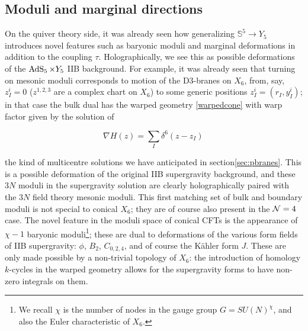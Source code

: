 %
%
%
%

\subsection{Moduli and marginal directions}

On the quiver theory side, it was already seen how generalizing $\mathbb{S}^5 \rightarrow Y_5$ introduces novel features such as baryonic moduli and marginal deformations in addition to the coupling $\tau$. Holographically, we see this as possible deformations of the $\operatorname{AdS}_{5} \times Y_5$ IIB background. For example, it was already seen that turning on mesonic moduli corresponds to motion of the D3-branes on $X_6$, from, say, $z_I^i = 0$ ($z^{1,2,3}$ are a complex chart on $X_6$) to some generic positions $z_I^i = (r_I, y_I^i)$; in that case the bulk dual has the warped geometry \eqref{warpedcone} with warp factor given by the solution of \cite{MZ}

\begin{equation}
	\nabla H (z) = \sum_I \delta^6(z - z_I)\,
	\label{}
\end{equation}

the kind of multicentre solutions we have anticipated in section\ref{sec:pbranes}. This is a possible deformation of the original IIB supergravity background, and these $3N$ moduli in the supergravity solution are clearly holographically paired with the $3N$ field theory mesonic moduli. This first matching set of bulk and boundary moduli is not special to conical $X_6$; they are of course also present in the $\mathcal{N}=4$ case. The novel feature in the moduli space of conical CFTs is the appearance of $\chi-1$ baryonic moduli\footnote{We recall $\chi$ is the number of nodes in the gauge group $G = SU(N)^\chi$, and also the Euler characteristic of $X_6$.}; these are dual to deformations of the various form fields of IIB supergravity: $\phi$, $B_2$, $C_{0,2,4}$, and of course the K\"ahler form $J$. These are only made possible by a non-trivial topology of $X_6$: the introduction of homology $k$-cycles in the warped geometry allows for the supergravity forms to have non-zero integrals on them.

